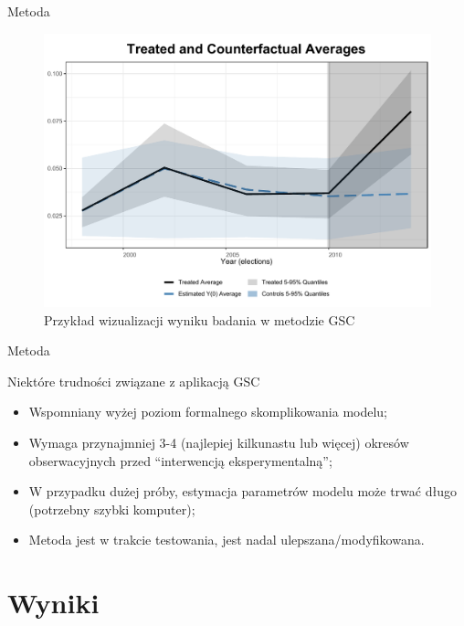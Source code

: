 \documentclass[12pt]{beamer}
\begin{document}
\begin{frame}{Metoda}

\begin{figure}
\includegraphics[scale=0.42]{ife_no_pred_2_factors_sample_0_2_band}
\caption{\label{fig:did}Przykład wizualizacji wyniku badania w metodzie GSC}
\end{figure}

\end{frame}


\begin{frame}{Metoda}

\begin{block}{Niektóre trudności związane z aplikacją GSC}
\begin{itemize}
\item Wspomniany wyżej poziom formalnego skomplikowania modelu;
\item Wymaga przynajmniej 3-4 (najlepiej kilkunastu lub więcej) okresów obserwacyjnych przed ``interwencją eksperymentalną'';
\item W przypadku dużej próby, estymacja parametrów modelu może trwać długo (potrzebny szybki komputer);
\item Metoda jest w trakcie testowania, jest nadal ulepszana/modyfikowana.
\end{itemize}
\end{block}

\end{frame}

\section{Wyniki}
\end{document}
